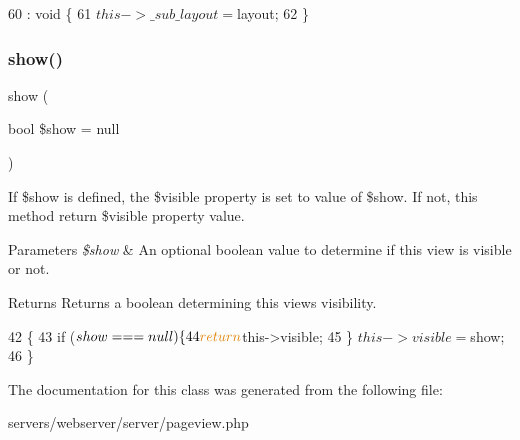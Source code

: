 \begin{DoxyCode}
60                                                : \textcolor{keywordtype}{void} \{
61         $this->\_sub\_layout = $layout;
62     \}
\end{DoxyCode}
\mbox{\label{class_lora_1_1_page_view_a14fdcc82bbf2c7647e9c6821a2227a1f}} 
\subsubsection{\texorpdfstring{show()}{show()}}
{\footnotesize\ttfamily show (\begin{DoxyParamCaption}\item[{bool}]{\$show = {\ttfamily null} }\end{DoxyParamCaption})}

If \$show is defined, the \$visible property is set to value of \$show. If not, this method return \$visible property value. 
\begin{DoxyParams}{Parameters}
{\em \$show} & An optional boolean value to determine if this view is visible or not. \\
\hline
\end{DoxyParams}
\begin{DoxyReturn}{Returns}
Returns a boolean determining this view\textquotesingle{}s visibility. 
\end{DoxyReturn}

\begin{DoxyCode}
42                                              \{
43         \textcolor{keywordflow}{if} ($show === null) \{
44             \textcolor{keywordflow}{return} $this->visible;
45         \} $this->visible = $show;
46     \}
\end{DoxyCode}


The documentation for this class was generated from the following file\+:\begin{DoxyCompactItemize}
\item 
servers/webserver/server/pageview.\+php\end{DoxyCompactItemize}
